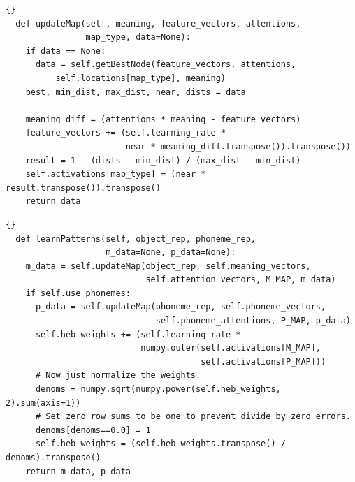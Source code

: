 \documentclass[a4paper,11pt]{article}
\begin{document}
\lstset{language=python}
\lstset{commentstyle=\textit}
\begin{center}
  \begin{table}
\begin{lstlisting}[frame=tb, label=cd:updateMap, caption=Source code to update meaning vectors and activations
for a single map]{}
  def updateMap(self, meaning, feature_vectors, attentions,
                map_type, data=None):
    if data == None:
      data = self.getBestNode(feature_vectors, attentions,
          self.locations[map_type], meaning)
    best, min_dist, max_dist, near, dists = data

    meaning_diff = (attentions * meaning - feature_vectors)
    feature_vectors += (self.learning_rate *
                        near * meaning_diff.transpose()).transpose())
    result = 1 - (dists - min_dist) / (max_dist - min_dist)
    self.activations[map_type] = (near * result.transpose()).transpose()
    return data
\end{lstlisting}
\end{table}
\end{center}

\begin{center}
\begin{table}
\begin{lstlisting}[frame=tb, label=cd:learnPatterns, caption=Source code to update a single map or update both
maps and hebbian links]{}
  def learnPatterns(self, object_rep, phoneme_rep,
                    m_data=None, p_data=None):
    m_data = self.updateMap(object_rep, self.meaning_vectors,
                            self.attention_vectors, M_MAP, m_data)
    if self.use_phonemes:
      p_data = self.updateMap(phoneme_rep, self.phoneme_vectors,
                              self.phoneme_attentions, P_MAP, p_data)
      self.heb_weights += (self.learning_rate *
                           numpy.outer(self.activations[M_MAP],
                                       self.activations[P_MAP]))
      # Now just normalize the weights.
      denoms = numpy.sqrt(numpy.power(self.heb_weights, 2).sum(axis=1))
      # Set zero row sums to be one to prevent divide by zero errors.
      denoms[denoms==0.0] = 1
      self.heb_weights = (self.heb_weights.transpose() / denoms).transpose()
    return m_data, p_data
\end{lstlisting}
\end{table}
\end{center}
\end{document}
